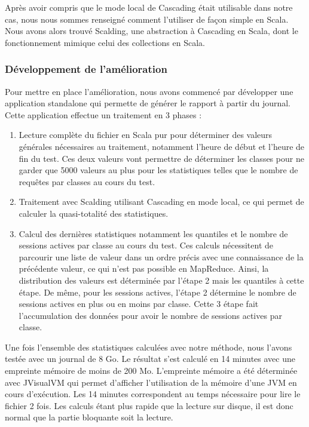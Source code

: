 Après avoir compris que le mode local de Cascading était utilisable dans notre cas, nous nous sommes renseigné comment l'utiliser de façon simple en Scala. Nous avons alors trouvé Scalding, une abstraction à Cascading en Scala, dont le fonctionnement mimique celui des collections en Scala.

\subsubsection{Développement de l'amélioration}

Pour mettre en place l'amélioration, nous avons commencé par développer une application standalone qui permette de générer le rapport à partir du journal. Cette application effectue un traitement en 3 phases :

\begin{enumerate}
 \item Lecture complète du fichier en Scala pur pour déterminer des valeurs générales nécessaires au traitement, notamment l'heure de début et l'heure de fin du test. Ces deux valeurs vont permettre de déterminer les classes pour ne garder que 5000 valeurs au plus pour les statistiques telles que le nombre de requêtes par classes au cours du test.
 \item Traitement avec Scalding utilisant Cascading en mode local, ce qui permet de calculer la quasi-totalité des statistiques.
 \item Calcul des dernières statistiques notamment les quantiles et le nombre de sessions actives par classe au cours du test. Ces calculs nécessitent de parcourir une liste de valeur dans un ordre précis avec une connaissance de la précédente valeur, ce qui n'est pas possible en MapReduce. Ainsi, la distribution des valeurs est déterminée par l'étape 2 mais les quantiles à cette étape. De même, pour les sessions actives, l'étape 2 détermine le nombre de sessions actives en plus ou en moins par classe. Cette 3\ieme{} étape fait l'accumulation des données pour avoir le nombre de sessions actives par classe.\\
\end{enumerate}

Une fois l'ensemble des statistiques calculées avec notre méthode, nous l'avons testée avec un journal de 8 Go. Le résultat s'est calculé en 14 minutes avec une empreinte mémoire de moins de 200 Mo. L'empreinte mémoire a été déterminée avec JVisualVM qui permet d'afficher l'utilisation de la mémoire d'une JVM en cours d'exécution. Les 14 minutes correspondent au temps nécessaire pour lire le fichier 2 fois. Les calculs étant plus rapide que la lecture sur disque, il est donc normal que la partie bloquante soit la lecture.\\

